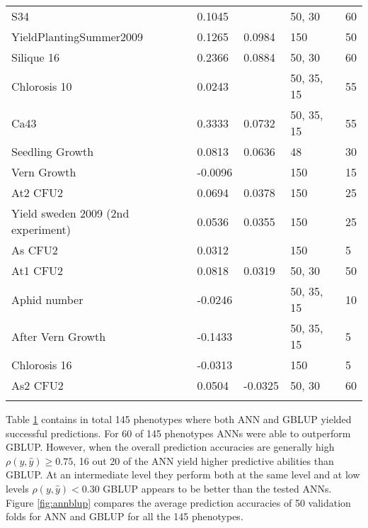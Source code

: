 \begin{longtable}{p{} p{} p{} p{} p{}}
  S34                                & 0.1045  & \color{red}{0.11}    & 50, 30       & 60     \\
  YieldPlantingSummer2009            & 0.1265  & 0.0984               & 150          & 50     \\
  Silique 16                         & 0.2366  & 0.0884               & 50, 30       & 60     \\
  Chlorosis 10                       & 0.0243  & \color{red}{0.088}   & 50, 35, 15   & 55     \\
  Ca43                               & 0.3333  & 0.0732               & 50, 35, 15   & 55     \\
  Seedling Growth                    & 0.0813  & 0.0636               & 48           & 30     \\
  Vern Growth                        & -0.0096 & \color{red}{0.0422}  & 150          & 15     \\
  At2 CFU2                           & 0.0694  & 0.0378               & 150          & 25     \\
  Yield sweden 2009 (2nd experiment) & 0.0536  & 0.0355               & 150          & 25     \\
  As CFU2                            & 0.0312  & \color{red}{0.035}   & 150          & 5      \\
  At1 CFU2                           & 0.0818  & 0.0319               & 50, 30       & 50     \\
  Aphid number                       & -0.0246 & \color{red}{0.029}   & 50, 35, 15   & 10     \\
  After Vern Growth                  & -0.1433 & \color{red}{0.0057}  & 50, 35, 15   & 5      \\
  Chlorosis 16                       & -0.0313 & \color{red}{-0.0121} & 150          & 5      \\
  As2 CFU2                           & 0.0504  & -0.0325              & 50, 30       & 60     \\
  \bottomrule
\label{tab:at_res}
\end{longtable}
\doublespacing


Table \ref{tab:at_res} contains in total 145 phenotypes where both ANN and GBLUP yielded
successful predictions. For 60 of 145 phenotypes ANNs were able to outperform
GBLUP. However, when the overall prediction accuracies are generally high
$\rho(y,\hat{y}) \geq 0.75$, 16 out 20 of the ANN yield higher predictive abilities than
GBLUP. At an intermediate level they perform both at the same level and at low levels
$\rho(y,\hat{y}) < 0.30$ GBLUP appears to be better than the tested ANNs.\\
Figure \ref{fig:annblup} compares the average prediction accuracies of 50 validation folds
for ANN and GBLUP for all the 145 phenotypes.

